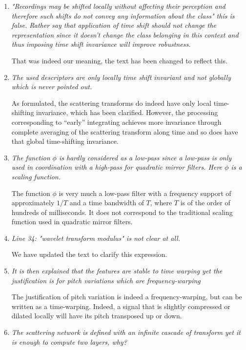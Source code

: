\documentclass[10pt]{article}
\begin{document}
\begin{enumerate}
\item \emph{"Recordings may be shifted locally 
without affecting their perception and therefore such shifts do not convey any information about the class" this is false. Rather say that application of time shift should not change the representation since it doesn't change the class belonging in this context and thus imposing time shift invariance will improve robustness.}

That was indeed our meaning, the text has been changed to reflect this.

\item \emph{The used descriptors are only locally time shift invariant and not globally which is never pointed out.}

As formulated, the scattering transforms do indeed have only local time-shifting invariance, which has been clarified. However, the processing corresponding to ``early'' integrating achieves more invariance through complete averaging of the scattering transform along time and so does have that global time-shifting invariance.

\item \emph{The function $\phi$ is hardly considered as a low-pass since a low-pass is only used in coordination with a high-pass for quadratic mirror filters. Here $\phi$ is a scaling function.}

The function $\phi$ is very much a low-pass filter with a frequency support of approximately $1/T$ and a time bandwidth of $T$, where $T$ is of the order of hundreds of milliseconds. It does not correspond to the traditional scaling function used in quadratic mirror filters.

\item \emph{Line 34: "wavelet transform modulus" is not clear at all.}

We have updated the text to clarify this expression.

\item \emph{It is then explained that the features are stable to time warping yet the justification is for pitch variations which are frequency-warping}

The justification of pitch variation is indeed a frequency-warping, but can be written as a time-warping. Indeed, a signal that is slightly compressed or dilated locally will have its pitch transposed up or down.

\item \emph{The scattering network is defined with an infinite cascade of transform yet it is enough to compute two layers, why?}


\end{enumerate}
\end{document}
